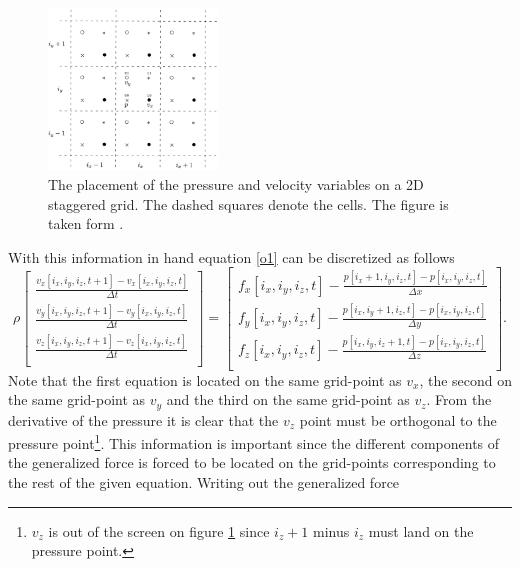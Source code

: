 \begin{figure}[H]
	\captionsetup{width=1\textwidth}
	\centering
	\includegraphics[width=0.4\textwidth]{figures/stag1}
	\caption{The placement of the pressure and velocity variables on a 2D staggered grid. The dashed squares denote the cells. The figure is taken form \citet{Lautrup}.}
	\label{fig:1}
\end{figure}
With this information in hand equation \eqref{o1} can be discretized as follows
\begin{equation}
	\rho \begin{bmatrix}
		\frac{v_x[i_x,i_y,i_z,t+1]-v_x[i_x,i_y,i_z,t]}{\Delta t}\\
		\frac{v_y[i_x,i_y,i_z,t+1]-v_y[i_x,i_y,i_z,t]}{\Delta t}\\
		\frac{v_z[i_x,i_y,i_z,t+1]-v_z[i_x,i_y,i_z,t]}{\Delta t}\\
	\end{bmatrix}=\begin{bmatrix}
		f_x[i_x,i_y,i_z,t]-\frac{p[i_x+1,i_y,i_z,t]-p[i_x,i_y,i_z,t]}{\Delta x}\\
		f_y[i_x,i_y,i_z,t]-\frac{p[i_x,i_y+1,i_z,t]-p[i_x,i_y,i_z,t]}{\Delta y}\\
		f_z[i_x,i_y,i_z,t]-\frac{p[i_x,i_y,i_z+1,t]-p[i_x,i_y,i_z,t]}{\Delta z}\\
	\end{bmatrix}.
\end{equation}
Note that the first equation is located on the same grid-point as $v_x$, the second on the same grid-point as $v_y$ and the third on the same grid-point as $v_z$. From the derivative of the pressure it is clear that the $v_z$ point must be orthogonal to the pressure point\footnote{$v_z$ is out of the screen on figure \ref{fig:1} since $i_z+1$ minus $i_z$ must land on the pressure point.}. This information is important since the different components of the generalized force is forced to be located on the grid-points corresponding to the rest of the given equation. Writing out the generalized force
